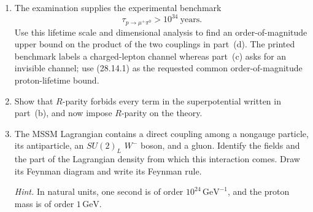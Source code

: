 \begin{enumerate}
\begin{enumerate}
    \item[(e)]
    The examination supplies the experimental benchmark
    \[
      \tau_{p\to\mu^+\pi^0}>10^{34}\ \mathrm{years}.
      \tag{28.14.1}
    \]
    Use this lifetime scale and dimensional analysis to find an
    order-of-magnitude upper bound on the product of the two couplings in
    part~(d).  The printed benchmark labels a charged-lepton channel whereas
    part~(c) asks for an invisible channel; use (28.14.1) as the requested
    common order-of-magnitude proton-lifetime bound.

    \item[(f)]
    Show that \(R\)-parity forbids every term in the superpotential written
    in part~(b), and now impose \(R\)-parity on the theory.

    \item[(g)]
    The MSSM Lagrangian contains a direct coupling among a nongauge particle,
    its antiparticle, an \(SU(2)_L\) \(W^-\) boson, and a gluon.  Identify the
    fields and the part of the Lagrangian density from which this interaction
    comes.  Draw its Feynman diagram and write its Feynman rule.

    \emph{Hint.}  In natural units, one second is of order
    \(10^{24}\,\mathrm{GeV}^{-1}\), and the proton mass is of order
    \(1\,\mathrm{GeV}\).
  \end{enumerate}


\end{enumerate}
